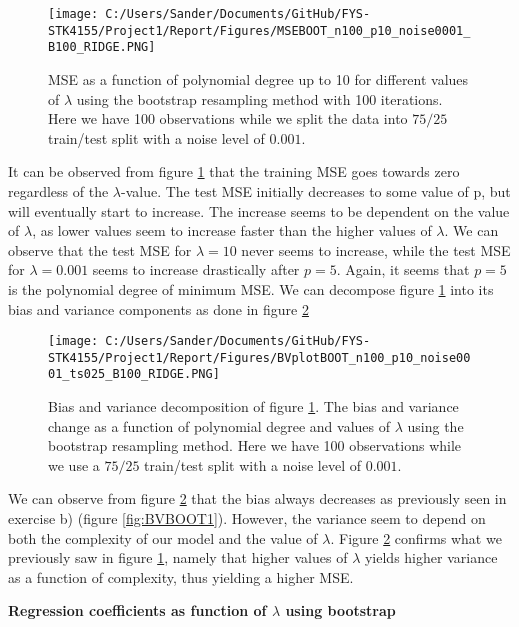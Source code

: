 \documentclass[12pt,a4paper]{article}
\begin{document}
\begin{figure}[H]
\centering
\texttt{[image: C:/Users/Sander/Documents/GitHub/FYS-STK4155/Project1/Report/Figures/MSEBOOT\_n100\_p10\_noise0001\_B100\_RIDGE.PNG]}
\caption{\label{fig:MSERidgeBoot3} MSE as a function of polynomial degree up to 10 for different values of $\lambda$ using the bootstrap resampling method with 100 iterations. Here we have 100 observations while we split the data into $75/25$ train/test split with a noise level of $0.001$.}
\end{figure}

\noindent It can be observed from figure \ref{fig:MSERidgeBoot3} that the training MSE goes towards zero regardless of the $\lambda$-value. The test MSE initially decreases to some value of p, but will eventually start to increase. The increase seems to be dependent on the value of $\lambda$, as lower values seem to increase faster than the higher values of $\lambda$. We can observe that the test MSE for $\lambda = 10$ never seems to increase, while the test MSE for $\lambda = 0.001$ seems to increase drastically after $p = 5$. Again, it seems that $p = 5$ is the polynomial degree of minimum MSE. We can decompose figure \ref{fig:MSERidgeBoot3} into its bias and variance components as done in figure \ref{fig:BVRidge1}

\begin{figure}[H]
\centering
\texttt{[image: C:/Users/Sander/Documents/GitHub/FYS-STK4155/Project1/Report/Figures/BVplotBOOT\_n100\_p10\_noise0001\_ts025\_B100\_RIDGE.PNG]}
\caption{\label{fig:BVRidge1} Bias and variance decomposition of figure \ref{fig:MSERidgeBoot3}. The bias and variance change as a function of polynomial degree and values of $\lambda$ using the bootstrap resampling method. Here we have 100 observations while we use a $75/25$ train/test split with a noise level of $0.001$.}
\end{figure}

\noindent We can observe from figure \ref{fig:BVRidge1} that the bias always decreases as previously seen in exercise b) (figure \ref{fig:BVBOOT1}). However, the variance seem to depend on both the complexity of our model and the value of $\lambda$. Figure \ref{fig:BVRidge1} confirms what we previously saw in figure \ref{fig:MSERidgeBoot3}, namely that higher values of $\lambda$ yields higher variance as a function of complexity, thus yielding a higher MSE.

\begin{center}
\large{\textbf{Regression coefficients as function of $\lambda$ using bootstrap}}
\end{center}
\end{document}
